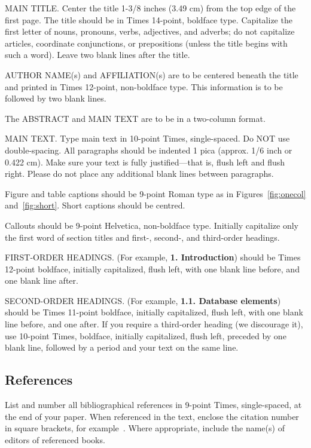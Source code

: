 \documentclass[10pt,twocolumn,letterpaper]{article}
\begin{document}
MAIN TITLE. Center the title 1-3/8 inches (3.49 cm) from the top edge of the
first page. The title should be in Times 14-point, boldface type. Capitalize the
first letter of nouns, pronouns, verbs, adjectives, and adverbs; do not
capitalize articles, coordinate conjunctions, or prepositions (unless the title
begins with such a word). Leave two blank lines after the title.

AUTHOR NAME(s) and AFFILIATION(s) are to be centered beneath the title and
printed in Times 12-point, non-boldface type. This information is to be followed
by two blank lines.

The ABSTRACT and MAIN TEXT are to be in a two-column format.

MAIN TEXT. Type main text in 10-point Times, single-spaced. Do NOT use
double-spacing. All paragraphs should be indented 1 pica (approx. 1/6 inch or
0.422 cm). Make sure your text is fully justified---that is, flush left and
flush right. Please do not place any additional blank lines between paragraphs.

Figure and table captions should be 9-point Roman type as in
Figures~\ref{fig:onecol} and~\ref{fig:short}.  Short captions should be centred.

\noindent Callouts should be 9-point Helvetica, non-boldface type. Initially
capitalize only the first word of section titles and first-, second-, and
third-order headings.

FIRST-ORDER HEADINGS. (For example, {\large \bf 1. Introduction}) should be
Times 12-point boldface, initially capitalized, flush left, with one blank line
before, and one blank line after.

SECOND-ORDER HEADINGS. (For example, { \bf 1.1. Database elements}) should be
Times 11-point boldface, initially capitalized, flush left, with one blank line
before, and one after. If you require a third-order heading (we discourage it),
use 10-point Times, boldface, initially capitalized, flush left, preceded by one
blank line, followed by a period and your text on the same line.


\subsection{References}

List and number all bibliographical references in 9-point Times, single-spaced,
at the end of your paper. When referenced in the text, enclose the citation
number in square brackets, for example~\cite{Authors14}.  Where appropriate,
include the name(s) of editors of referenced books.
\end{document}
